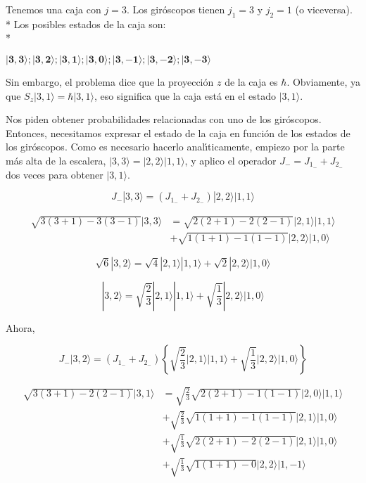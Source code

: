   \begin{solution}
    \begin{parts}
      \item Tenemos una caja con $j=3$. Los giróscopos tienen $j_1=3$ y $j_2=1$ (o viceversa).\\*
      Los posibles estados de la caja son:\\*
     \begin{doublespace}
  \noindent\(\pmb{|3,3\rangle ; |3,2\rangle ; |3,1\rangle ; |3,0\rangle ; |3,-1\rangle ; |3,-2\rangle ; |3,-3\rangle }\)
  \end{doublespace}
  
  Sin embargo, el problema dice que la proyecci{\' o}n \(z\) de la caja es $\hbar $. Obviamente, ya que { }\(S_z|3,1\rangle = \hbar  |3,1\rangle\),
  eso significa que la caja est{\' a} en el estado \(|3,1\rangle\).
  
  Nos piden obtener probabilidades relacionadas con uno de los gir{\' o}scopos. Entonces, necesitamos expresar el estado de la caja en funci{\' o}n
  de los estados de los gir{\' o}scopos. Como es necesario hacerlo anal{\' \i}ticamente, empiezo por la parte m{\' a}s alta de la escalera, \(|3,3\rangle
  =|2,2\rangle |1,1\rangle\), y aplico el operador \(J_-=J_{1_-}+J_{2_-}\) dos veces para obtener \(|3,1\rangle\).
  
  \[J_-|3,3\rangle =\left(J_{1_-}+J_{2_-}\right)|2,2\rangle |1,1\rangle\]
  
  \begin{align*}
       \sqrt{3(3+1)-3(3-1)}|3,3\rangle &=\sqrt{2(2+1)-2(2-1)}|2,1\rangle |1,1\rangle \\
  &+\sqrt{1(1+1)-1(1-1)}|2,2\rangle |1,0\rangle\
  \end{align*}
  
  \[\sqrt{6}|3,2\rangle =\sqrt{4}|2,1\rangle |1,1\rangle +\sqrt{2}|2,2\rangle |1,0\rangle\]
  
  \[|3,2\rangle =\sqrt{\frac{2}{3}}|2,1\rangle |1,1\rangle +\sqrt{\frac{1}{3}}|2,2\rangle |1,0\rangle\]
  
  Ahora,
  
  \[J_-|3,2\rangle =\left(J_{1_-}+J_{2_-}\right)\left\{\sqrt{\frac{2}{3}}|2,1\rangle |1,1\rangle +\sqrt{\frac{1}{3}}|2,2\rangle |1,0\rangle \right\}\]
  
  \begin{align*}
      \sqrt{3(3+1)-2(2-1)}|3,1\rangle &=\sqrt{\frac{2}{3}}\sqrt{2(2+1)-1(1-1)}|2,0\rangle |1,1\rangle \\ &+\sqrt{\frac{2}{3}}\sqrt{1(1+1)-1(1-1)}|2,1\rangle|1,0\rangle \\
     &+\sqrt{\frac{1}{3}}\sqrt{2(2+1)-2(2-1)}|2,1\rangle |1,0\rangle \\
      &+\sqrt{\frac{1}{3}}\sqrt{1(1+1)-0}|2,2\rangle |1,-1\rangle
  \end{align*}
  

\end{parts}
\end{solution}
